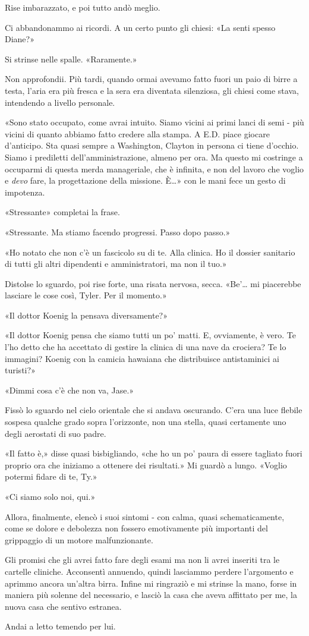 Rise imbarazzato, e poi tutto andò meglio.

Ci abbandonammo ai ricordi. A un certo punto gli chiesi: «La senti
spesso Diane?»

Si strinse nelle spalle. «Raramente.»

Non approfondii. Più tardi, quando ormai avevamo fatto fuori un paio di
birre a testa, l'aria era più fresca e la sera era diventata silenziosa,
gli chiesi come stava, intendendo a livello personale.

«Sono stato occupato, come avrai intuito. Siamo vicini ai primi lanci di
semi - più vicini di quanto abbiamo fatto credere alla stampa. A E.D.
piace giocare d'anticipo. Sta quasi sempre a Washington, Clayton in
persona ci tiene d'occhio. Siamo i prediletti dell'amministrazione,
almeno per ora. Ma questo mi costringe a occuparmi di questa merda
manageriale, che è infinita, e non del lavoro che voglio e \emph{devo}
fare, la progettazione della missione. È\ldots» con le mani fece un
gesto di impotenza.

«Stressante» completai la frase.

«Stressante. Ma stiamo facendo progressi. Passo dopo passo.»

«Ho notato che non c'è un fascicolo su di te. Alla clinica. Ho il
dossier sanitario di tutti gli altri dipendenti e amministratori, ma non
il tuo.»

Distolse lo sguardo, poi rise forte, una risata nervosa, secca.
«Be'\ldots{} mi piacerebbe lasciare le cose così, Tyler. Per il
momento.»

«Il dottor Koenig la pensava diversamente?»

«Il dottor Koenig pensa che siamo tutti un po' matti. E, ovviamente, è
vero. Te l'ho detto che ha accettato di gestire la clinica di una nave
da crociera? Te lo immagini? Koenig con la camicia hawaiana che
distribuisce antistaminici ai turisti?»

«Dimmi cosa c'è che non va, Jase.»

Fissò lo sguardo nel cielo orientale che si andava oscurando. C'era una
luce flebile sospesa qualche grado sopra l'orizzonte, non una stella,
quasi certamente uno degli aerostati di suo padre.

«Il fatto è,» disse quasi bisbigliando, «che ho un po' paura di essere
tagliato fuori proprio ora che iniziamo a ottenere dei risultati.» Mi
guardò a lungo. «Voglio potermi fidare di te, Ty.»

«Ci siamo solo noi, qui.»

Allora, finalmente, elencò i suoi sintomi - con calma, quasi
schematicamente, come se dolore e debolezza non fossero emotivamente più
importanti del grippaggio di un motore malfunzionante.

Gli promisi che gli avrei fatto fare degli esami ma non li avrei
inseriti tra le cartelle cliniche. Acconsentì annuendo, quindi lasciammo
perdere l'argomento e aprimmo ancora un'altra birra. Infine mi ringraziò
e mi strinse la mano, forse in maniera più solenne del necessario, e
lasciò la casa che aveva affittato per me, la nuova casa che sentivo
estranea.

Andai a letto temendo per lui.